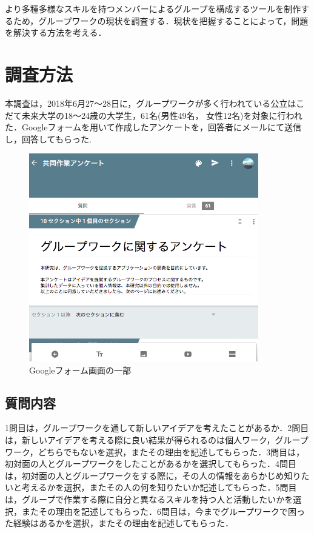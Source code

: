 \documentclass{funthesis}
\begin{document}
より多種多様なスキルを持つメンバーによるグループを構成するツールを制作するため，グループワークの現状を調査する．現状を把握することによって，問題を解決する方法を考える．

\section{調査方法}

本調査は，2018年6月27〜28日に，グループワークが多く行われている公立はこだて未来大学の18〜24歳の大学生，61名(男性49名， 女性12名)を対象に行われた．Googleフォームを用いて作成したアンケートを，回答者にメールにて送信し，回答してもらった.
\begin{figure}[h]
 \centering
   \includegraphics[width=100mm]{figures/groupwork1.png}
 \caption{Googleフォーム画面の一部}
 \label{fig:model}
\end{figure}


\subsection{質問内容}

1問目は，グループワークを通して新しいアイデアを考えたことがあるか．2問目は，新しいアイデアを考える際に良い結果が得られるのは個人ワーク，グループワーク，どちらでもないを選択，またその理由を記述してもらった．3問目は，初対面の人とグループワークをしたことがあるかを選択してもらった．4問目は，初対面の人とグループワークをする際に，その人の情報をあらかじめ知りたいと考えるかを選択，またその人の何を知りたいか記述してもらった．5問目は，グループで作業する際に自分と異なるスキルを持つ人と活動したいかを選択，またその理由を記述してもらった．6問目は，今までグループワークで困った経験はあるかを選択，またその理由を記述してもらった．
\end{document}
